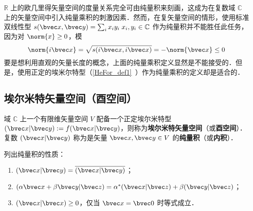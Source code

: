 
\begin{issues}
\issueTODO
\end{issues}

$\mathbb{R}$ 上的欧几里得矢量空间的度量关系完全可由纯量积来刻画，这成为在复数域 $\mathbb{C}$ 上的矢量空间中引入纯量乘积的刺激因素．然而，在复矢量空间的情形，使用标准双线性型 $s(\bvec x,\bvec y)=\sum_{i}x_iy_i\;x_i,y_i\in\mathbb{C}$ 作为纯量积并不能胜任此任务，因为对 $\norm{x}\geq0$，模
\begin{equation}
\norm{i\bvec x}=\sqrt{s(i\bvec x,i\bvec x)}=-\norm{\bvec x}\leq0
\end{equation}
要是想利用直观的矢量长度的概念，上面的纯量乘积定义显然是不能接受的．但是，使用正定的埃米尔特型（\autoref{HeFor_def1}~）作为纯量乘积的定义却是适合的．
\subsection{埃尔米特矢量空间（酉空间）}
\begin{definition}{}
域 $\mathbb{C}$ 上一个有限维矢量空间 $V$ 配备一个正定埃尔米特型$(\bvec x|\bvec y):=f(\bvec x|\bvec y)$，则称为\textbf{埃尔米特矢量空间}（或\textbf{酉空间}）．复数 $(\bvec x|\bvec y)$ 称为是矢量 $\bvec x,\bvec y\in V$ 的\textbf{纯量积}（或\textbf{内积}）．
\end{definition}
列出纯量积的性质：
\begin{enumerate}
\item $(\bvec x|\bvec y)=\overline{(\bvec x|\bvec y)}$；
\item $(\alpha\bvec x+\beta\bvec y|\bvec z)=\alpha^*(\bvec x|\bvec z)+\beta(\bvec y|\bvec z)$；
\item $(\bvec x|\bvec x)\geq0$，仅当 $\bvec x=\bvec 0$ 时等式成立．
\end{enumerate}
